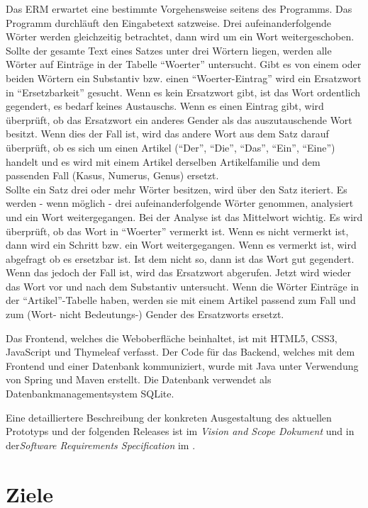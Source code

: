 \documentclass[paper=a4, parskip=half]{scrreprt}
\begin{document}
Das ERM erwartet eine bestimmte Vorgehensweise seitens des Programms.
Das Programm durchläuft den Eingabetext satzweise. Drei aufeinanderfolgende Wörter werden gleichzeitig betrachtet, dann wird um ein Wort weitergeschoben. \\
Sollte der gesamte Text eines Satzes unter drei Wörtern liegen, werden alle Wörter auf Einträge in der Tabelle ``Woerter'' untersucht. Gibt es von einem oder beiden Wörtern ein Substantiv bzw. einen ``Woerter-Eintrag'' wird ein Ersatzwort in ``Ersetzbarkeit'' gesucht. Wenn es kein Ersatzwort gibt, ist das Wort ordentlich gegendert, es bedarf keines Austauschs. Wenn es einen Eintrag gibt, wird überprüft, ob das Ersatzwort ein anderes Gender als das auszutauschende Wort besitzt. Wenn dies der Fall ist, wird das andere Wort aus dem Satz darauf überprüft, ob es sich um einen Artikel (``Der'', ``Die'', ``Das'', ``Ein'', ``Eine'') handelt und es wird mit einem Artikel derselben Artikelfamilie und dem passenden Fall (Kasus, Numerus, Genus) ersetzt. \\
Sollte ein Satz drei oder mehr Wörter besitzen, wird über den Satz iteriert. Es werden - wenn möglich - drei aufeinanderfolgende Wörter genommen, analysiert und ein Wort weitergegangen. Bei der Analyse ist das Mittelwort wichtig. Es wird überprüft, ob das Wort in ``Woerter'' vermerkt ist. Wenn es nicht vermerkt ist, dann wird ein Schritt bzw. ein Wort weitergegangen. Wenn es vermerkt ist, wird abgefragt ob es ersetzbar ist. Ist dem nicht so, dann ist das Wort gut gegendert. Wenn das jedoch der Fall ist, wird das Ersatzwort abgerufen. Jetzt wird wieder das Wort vor und nach dem Substantiv untersucht. Wenn die Wörter Einträge in der ``Artikel''-Tabelle haben, werden sie mit einem Artikel passend zum Fall und zum (Wort- nicht Bedeutungs-) Gender des Ersatzworts ersetzt.

Das Frontend, welches die Weboberfläche beinhaltet, ist mit HTML5, CSS3, JavaScript und Thymeleaf verfasst. Der Code für das Backend, welches mit dem Frontend und einer Datenbank kommuniziert, wurde mit Java unter Verwendung von Spring und Maven erstellt. Die Datenbank verwendet als Datenbankmanagementsystem SQLite.


Eine detailliertere Beschreibung der konkreten Ausgestaltung des aktuellen Prototyps und der folgenden Releases ist im \textit{Vision and Scope Dokument} und in der\textit{Software Requirements Specification} im \textcolor{blue}{}.


\chapter{Ziele}
\end{document}
